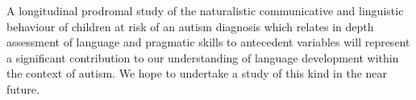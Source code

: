 \documentclass[output=paper]{langsci/langscibook}
\begin{document}
A longitudinal prodromal study of the naturalistic communicative and linguistic behaviour of children at risk of an autism diagnosis which relates in depth assessment of language and pragmatic skills to antecedent variables will represent a significant contribution to our understanding of language development within the context of autism. We hope to undertake a study of this kind in the near future.  

{\sloppy
\printbibliography[heading=subbibliography,notkeyword=this]
}
\end{document}
